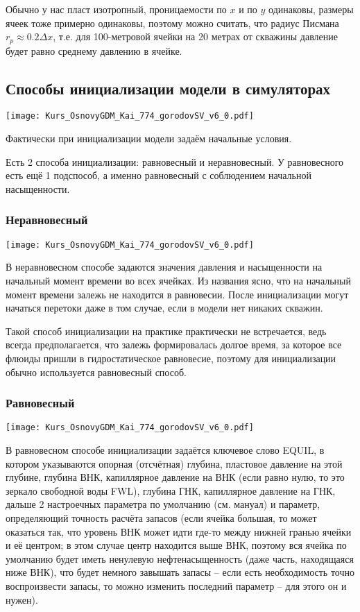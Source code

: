 \documentclass[main.tex]{subfiles}
\begin{document}
Обычно у нас пласт изотропный, проницаемости по $x$ и по $y$ одинаковы, размеры ячеек тоже примерно одинаковы, поэтому можно считать, что радиус Писмана $r_p\approx0.2\Delta x$, т.е. для 100-метровой ячейки на 20 метрах от скважины давление будет равно среднему давлению в ячейке.

\subsection{Способы инициализации модели в симуляторах}

\texttt{[image: Kurs\_OsnovyGDM\_Kai\_774\_gorodovSV\_v6\_0.pdf]}

Фактически при инициализации модели задаём начальные условия.

Есть 2 способа инициализации: равновесный и неравновесный.
У равновесного есть ещё 1 подспособ, а именно равновесный с соблюдением начальной насыщенности.  

\subsubsection{Неравновесный}

\texttt{[image: Kurs\_OsnovyGDM\_Kai\_774\_gorodovSV\_v6\_0.pdf]}

В неравновесном способе задаются значения давления и насыщенности на начальный момент времени во всех ячейках.
Из названия ясно, что на начальный момент времени залежь не находится в равновесии.
После инициализации могут начаться перетоки даже в том случае, если в модели нет никаких скважин.

Такой способ инициализации на практике практически не встречается, ведь всегда предполагается, что залежь формировалась долгое время, за которое все флюиды пришли в гидростатическое равновесие, поэтому для инициализации обычно используется равновесный способ.

\subsubsection{Равновесный}

\texttt{[image: Kurs\_OsnovyGDM\_Kai\_774\_gorodovSV\_v6\_0.pdf]}

В равновесном способе инициализации задаётся ключевое слово EQUIL, в котором указываются опорная (отсчётная) глубина, пластовое давление на этой глубине, глубина ВНК, капиллярное давление на ВНК (если равно нулю, то это зеркало свободной воды FWL), глубина ГНК, капиллярное давление на ГНК, дальше 2 настроечных параметра по умолчанию (см. мануал) и параметр, определяющий точность расчёта запасов (если ячейка большая, то может оказаться так, что уровень ВНК может идти где-то между нижней гранью ячейки и её центром; в этом случае центр находится выше ВНК, поэтому вся ячейка по умолчанию будет иметь ненулевую нефтенасыщенность (даже часть, находящаяся ниже ВНК), что будет немного завышать запасы -- если есть необходимость точно воспроизвести запасы, то можно изменить последний параметр -- для этого он и нужен).
\\
\end{document}
